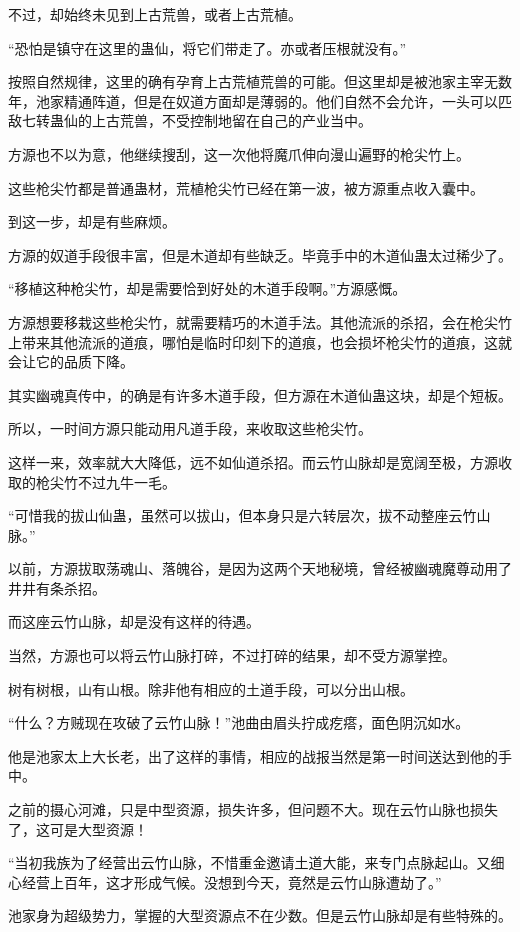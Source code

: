 \begin{this_body}
不过，却始终未见到上古荒兽，或者上古荒植。

“恐怕是镇守在这里的蛊仙，将它们带走了。亦或者压根就没有。”

按照自然规律，这里的确有孕育上古荒植荒兽的可能。但这里却是被池家主宰无数年，池家精通阵道，但是在奴道方面却是薄弱的。他们自然不会允许，一头可以匹敌七转蛊仙的上古荒兽，不受控制地留在自己的产业当中。

方源也不以为意，他继续搜刮，这一次他将魔爪伸向漫山遍野的枪尖竹上。

这些枪尖竹都是普通蛊材，荒植枪尖竹已经在第一波，被方源重点收入囊中。

到这一步，却是有些麻烦。

方源的奴道手段很丰富，但是木道却有些缺乏。毕竟手中的木道仙蛊太过稀少了。

“移植这种枪尖竹，却是需要恰到好处的木道手段啊。”方源感慨。

方源想要移栽这些枪尖竹，就需要精巧的木道手法。其他流派的杀招，会在枪尖竹上带来其他流派的道痕，哪怕是临时印刻下的道痕，也会损坏枪尖竹的道痕，这就会让它的品质下降。

其实幽魂真传中，的确是有许多木道手段，但方源在木道仙蛊这块，却是个短板。

所以，一时间方源只能动用凡道手段，来收取这些枪尖竹。

这样一来，效率就大大降低，远不如仙道杀招。而云竹山脉却是宽阔至极，方源收取的枪尖竹不过九牛一毛。

“可惜我的拔山仙蛊，虽然可以拔山，但本身只是六转层次，拔不动整座云竹山脉。”

以前，方源拔取荡魂山、落魄谷，是因为这两个天地秘境，曾经被幽魂魔尊动用了井井有条杀招。

而这座云竹山脉，却是没有这样的待遇。

当然，方源也可以将云竹山脉打碎，不过打碎的结果，却不受方源掌控。

树有树根，山有山根。除非他有相应的土道手段，可以分出山根。

“什么？方贼现在攻破了云竹山脉！”池曲由眉头拧成疙瘩，面色阴沉如水。

他是池家太上大长老，出了这样的事情，相应的战报当然是第一时间送达到他的手中。

之前的摄心河滩，只是中型资源，损失许多，但问题不大。现在云竹山脉也损失了，这可是大型资源！

“当初我族为了经营出云竹山脉，不惜重金邀请土道大能，来专门点脉起山。又细心经营上百年，这才形成气候。没想到今天，竟然是云竹山脉遭劫了。”

池家身为超级势力，掌握的大型资源点不在少数。但是云竹山脉却是有些特殊的。


\end{this_body}
